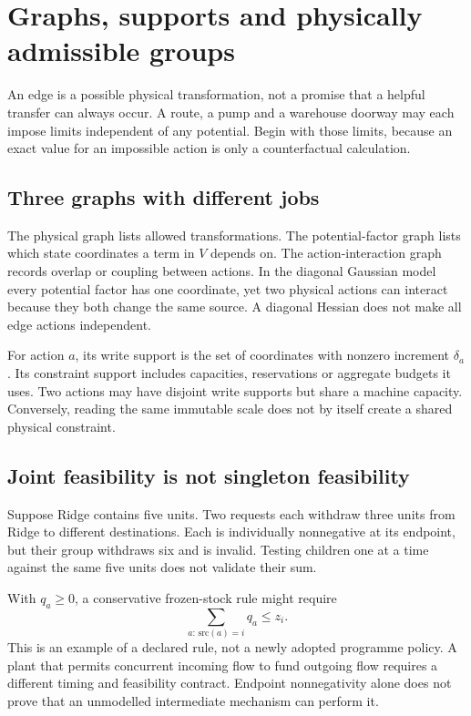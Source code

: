 \chapter{Graphs, supports and physically admissible groups}\label{ch:graphs}
An edge is a possible physical transformation, not a promise that a helpful
transfer can always occur. A route, a pump and a warehouse doorway may each
impose limits independent of any potential. Begin with those limits, because
an exact value for an impossible action is only a counterfactual calculation.

\section{Three graphs with different jobs}
The physical graph lists allowed transformations. The potential-factor graph
lists which state coordinates a term in $V$ depends on. The action-interaction
graph records overlap or coupling between actions. In the diagonal Gaussian
model every potential factor has one coordinate, yet two physical actions
can interact because they both change the same source. A diagonal Hessian
does not make all edge actions independent.

For action $a$, its write support is the set of coordinates with nonzero
increment $\delta_a$. Its constraint support includes capacities, reservations
or aggregate budgets it uses. Two actions may have disjoint write supports
but share a machine capacity. Conversely, reading the same immutable scale
does not by itself create a shared physical constraint.

\section{Joint feasibility is not singleton feasibility}
Suppose Ridge contains five units. Two requests each withdraw three units
from Ridge to different destinations. Each is individually nonnegative at
its endpoint, but their group withdraws six and is invalid. Testing children
one at a time against the same five units does not validate their sum.

With $q_a\geq0$, a conservative frozen-stock rule might require
\begin{equation}
 \sum_{a:\,\mathrm{src}(a)=i}q_a\leq z_i.
\end{equation}
This is an example of a declared rule, not a newly adopted programme policy.
A plant that permits concurrent incoming flow to fund outgoing flow requires
a different timing and feasibility contract. Endpoint nonnegativity alone
does not prove that an unmodelled intermediate mechanism can perform it.

